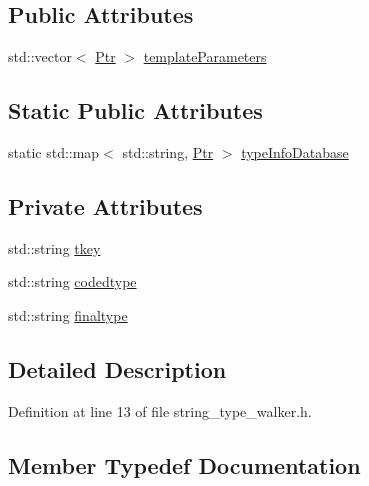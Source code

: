 \subsection*{Public Attributes}
\begin{DoxyCompactItemize}
\item 
std\+::vector$<$ \hyperlink{classsmacc_1_1introspection_1_1TypeInfo_aa6ffd9c39811d59f7c771941b7fad860}{Ptr} $>$ \hyperlink{classsmacc_1_1introspection_1_1TypeInfo_aed5166ab8bcd94489e7bc87deb01de5c}{template\+Parameters}
\end{DoxyCompactItemize}
\subsection*{Static Public Attributes}
\begin{DoxyCompactItemize}
\item 
static std\+::map$<$ std\+::string, \hyperlink{classsmacc_1_1introspection_1_1TypeInfo_aa6ffd9c39811d59f7c771941b7fad860}{Ptr} $>$ \hyperlink{classsmacc_1_1introspection_1_1TypeInfo_ab780c03206b824aaf338135d16b0eff4}{type\+Info\+Database}
\end{DoxyCompactItemize}
\subsection*{Private Attributes}
\begin{DoxyCompactItemize}
\item 
std\+::string \hyperlink{classsmacc_1_1introspection_1_1TypeInfo_a697dd505119258dba1224d10eea5b2bd}{tkey}
\item 
std\+::string \hyperlink{classsmacc_1_1introspection_1_1TypeInfo_a117d2b73994b78a6e4e81cdf7054912c}{codedtype}
\item 
std\+::string \hyperlink{classsmacc_1_1introspection_1_1TypeInfo_aa4010ed427e12db443e08ab16a3de243}{finaltype}
\end{DoxyCompactItemize}


\subsection{Detailed Description}


Definition at line 13 of file string\+\_\+type\+\_\+walker.\+h.



\subsection{Member Typedef Documentation}
